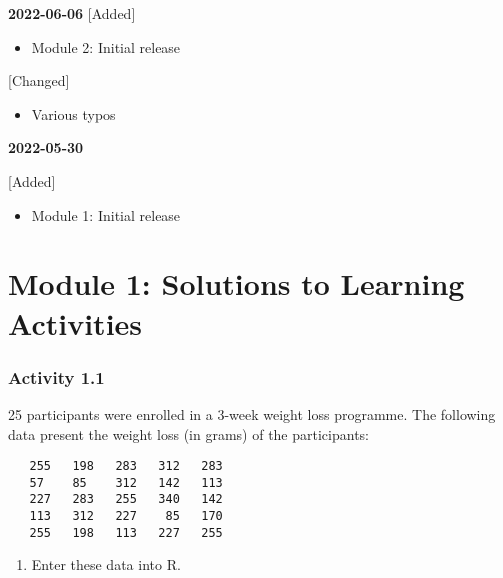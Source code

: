 \documentclass[
]{memoir}
\providecommand{\tightlist}{%
  \setlength{\itemsep}{0pt}\setlength{\parskip}{0pt}}
\begin{document}
\textbf{2022-06-06}
{[}Added{]}

\begin{itemize}
\tightlist
\item
  Module 2: Initial release
\end{itemize}

{[}Changed{]}

\begin{itemize}
\tightlist
\item
  Various typos
\end{itemize}

\textbf{2022-05-30}

{[}Added{]}

\begin{itemize}
\tightlist
\item
  Module 1: Initial release
\end{itemize}

\hypertarget{module-1-solutions-to-learning-activities}{%
\chapter*{Module 1: Solutions to Learning Activities}\label{module-1-solutions-to-learning-activities}}

\hypertarget{activity-1.1}{%
\subsection*{Activity 1.1}\label{activity-1.1}}

25 participants were enrolled in a 3-week weight loss programme. The following data present the weight loss (in grams) of the participants:

\begin{verbatim}
   255   198   283   312   283
   57    85    312   142   113
   227   283   255   340   142
   113   312   227    85   170
   255   198   113   227   255
\end{verbatim}

\begin{enumerate}
\def\labelenumi{\alph{enumi})}
\tightlist
\item
  Enter these data into R.
\end{enumerate}
\end{document}
